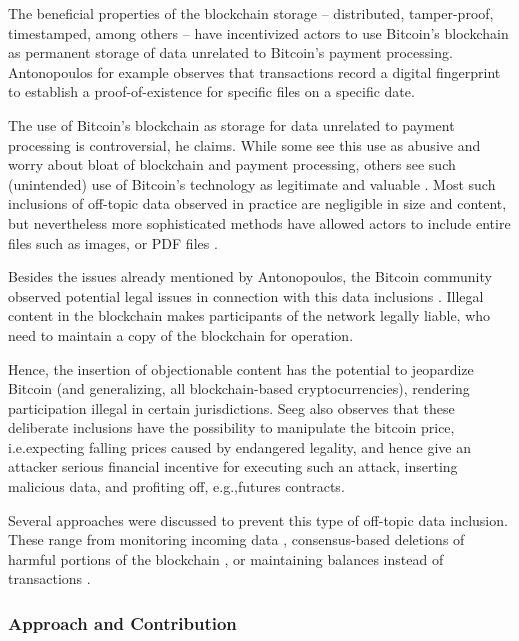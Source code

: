 \documentclass[a4paper,11pt,titlepage]{scrbook}
\begin{document}
The beneficial properties of the blockchain storage – distributed, tamper-proof, timestamped, among others – have incentivized actors to use Bitcoin's blockchain as permanent storage of data unrelated to Bitcoin's payment processing.
Antonopoulos for example observes that transactions record a digital fingerprint to establish a proof-of-existence for specific files on a specific date.

The use of Bitcoin's blockchain as storage for data unrelated to payment processing is controversial, he claims.
While some see this use as abusive and worry about bloat of blockchain and payment processing, others see such (unintended) use of Bitcoin's technology as legitimate and valuable \cite[155]{antonopoulos_mastering_2017}.
Most such inclusions of off-topic data observed in practice are negligible in size and content, but nevertheless more sophisticated methods have allowed actors to include entire files such as images, or PDF files \cite{matzutt_quantitative_2018}.

Besides the issues already mentioned by Antonopoulos, the Bitcoin community observed potential legal issues in connection with this data inclusions \cite{bitcoinwiki_weaknesses_2011}.
Illegal content in the blockchain makes participants of the network legally liable, who need to maintain a copy of the blockchain for operation.

Hence, the insertion of objectionable content has the potential to jeopardize Bitcoin (and generalizing, all blockchain-based cryptocurrencies), rendering participation illegal in certain jurisdictions.
Seeg \cite[1--2]{seeg_hardening_2018} also observes that these deliberate inclusions have the possibility to manipulate the bitcoin price, i.e.\@ expecting falling prices caused by endangered legality, and hence give an attacker serious financial incentive for executing such an attack, inserting malicious data, and profiting off, e.g.,\@ futures contracts.

Several approaches were discussed to prevent this type of off-topic data inclusion.
These range from monitoring incoming data \cite[Sec.~IV.A]{matzutt_thwarting_2018}, consensus-based deletions of harmful portions of the blockchain \cites{ateniese_redactable_2017}{puddu_chain:_2017}, 
or maintaining balances instead of transactions \cite{bruce_miniblockchain_2017}.

\subsubsection*{Approach and Contribution}
\end{document}
